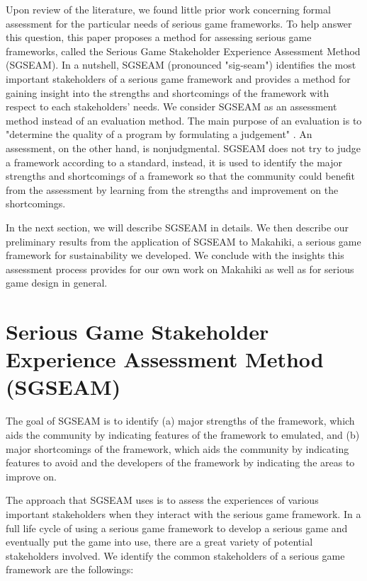 \documentclass{sigchi}
\begin{document}
Upon review of the literature, we found little prior work concerning formal assessment for
the particular needs of serious game frameworks. To help answer this question, this paper
proposes a method for assessing serious game frameworks, called the Serious Game Stakeholder
Experience Assessment Method (SGSEAM). In a nutshell, SGSEAM (pronounced "sig-seam")
identifies the most important stakeholders of a
serious game framework and provides a method for gaining insight into the strengths
and shortcomings of the framework with respect to each stakeholders' needs. We consider
SGSEAM as an assessment method instead of an evaluation method. The main purpose of an
evaluation is to "determine the quality of a program by formulating a judgement"
\cite{hurteau2009legitimate}. An assessment, on the other hand, is nonjudgmental. SGSEAM does
not try to judge a framework according to a standard, instead, it is used to identify the major
strengths and shortcomings of a framework so that the community could benefit from the
assessment by learning from the strengths and improvement on the shortcomings.

In the next section, we will describe SGSEAM in details. We then describe our preliminary results
from the application of SGSEAM to Makahiki, a serious game framework for sustainability we
developed. We conclude with the insights this assessment process provides
for our own work on Makahiki as well as for serious game design in general.

\section{Serious Game Stakeholder Experience Assessment Method (SGSEAM)}

The goal of SGSEAM is to identify (a) major strengths of the
framework, which aids the community by indicating features of the framework to emulated, and
(b) major shortcomings of the framework, which aids the community by indicating features to avoid
and the developers of the framework by indicating the areas to improve on.

The approach that SGSEAM uses is to assess the experiences of various important stakeholders when
they interact with the serious game framework. In a full life cycle of using a serious game
framework to develop a serious game and eventually put the game into use, there are a great
variety of potential stakeholders involved. We identify the common stakeholders of a serious game
framework are the followings:
\end{document}
